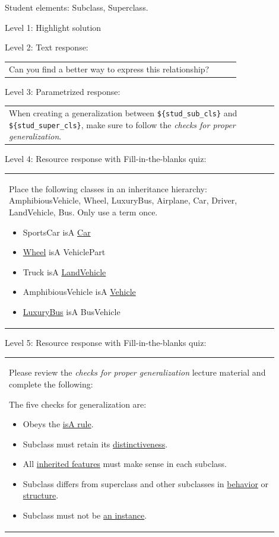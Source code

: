 Student elements: Subclass, Superclass.  \medskip

\noindent Level 1: Highlight solution  \medskip

\noindent Level 2: Text response: \medskip

\begin{tabular}{|p{0.9\linewidth}}
Can you find a better way to express this relationship?
\end{tabular} \medskip

\noindent Level 3: Parametrized response: \medskip

\begin{tabular}{|p{0.9\linewidth}}
When creating a generalization between \verb|${stud_sub_cls}| and \verb|${stud_super_cls}|, make sure to follow the \textit{checks for proper generalization}.
\end{tabular} \medskip

\noindent Level 4: Resource response with Fill-in-the-blanks quiz: \medskip

\begin{tabular}{|p{0.9\linewidth}}

Place the following classes in an inheritance hierarchy: AmphibiousVehicle, Wheel, LuxuryBus, Airplane, Car, Driver, LandVehicle, Bus. Only use a term once.

\begin{itemize}
    \item SportsCar isA \underline{Car}
    \item \underline{Wheel} isA VehiclePart
    \item Truck isA \underline{LandVehicle}
    \item AmphibiousVehicle isA \underline{Vehicle}
    \item \underline{LuxuryBus} isA BusVehicle
\end{itemize}

\end{tabular} \medskip

\noindent Level 5: Resource response with Fill-in-the-blanks quiz: \medskip

\begin{tabular}{|p{0.9\linewidth}}

Please review the \textit{checks for proper generalization} lecture material
and complete the following:

The five checks for generalization are:

\begin{itemize}
    \item Obeys the \underline{isA rule}.
    \item Subclass must retain its \underline{distinctiveness}.
    \item All \underline{inherited features} must make sense in each subclass.
    \item Subclass differs from superclass and other subclasses in \underline{behavior} or \underline{structure}.
    \item Subclass must not be \underline{an instance}.
\end{itemize}

\end{tabular} \medskip

